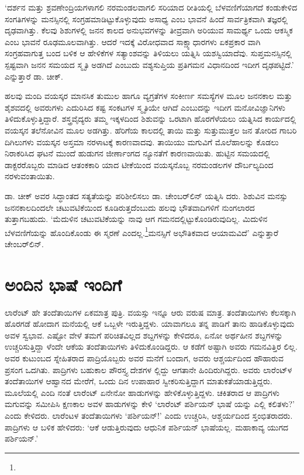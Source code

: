 ‘ದರ್ಶನ ಮತ್ತು ಶ್ರವಣೇಂದ್ರಿಯಗಳಾಗಲಿ ನರಮಂಡಲವಾಗಲಿ ಸರಿಯಾದ ರೀತಿಯಲ್ಲಿ ಬೆಳವಣಿಗೆಯಾಗದೆ ಕಂಡುಕೇಳಿದ ಸಂಗತಿಗಳನ್ನು ಮನಸ್ಸಿನಲ್ಲಿ ಸಂಗ್ರಹಮಾಡಿಟ್ಟುಕೊಳ್ಳುವುದು ಅಸಾಧ್ಯ ಎಂಬ ಭಾವನೆ ಹಿಂದೆ ಸಾರ್ವತ್ರಿಕವಾಗಿ ತಜ್ಞರಲ್ಲಿ ದೃಢವಾಗಿತ್ತು. ಕೆಲವು ಶಿಶುಗಳಲ್ಲಿ ಜನನ ಕಾಲದ ಅನುಭವಗಳನ್ನು ತೀವ್ರವಾಗಿ ಅರಿಯುವ ಸಾಮರ್ಥ್ಯ ಒಂದು ಆಕಸ್ಮಿಕ ಎಂಬ ಭಾವನೆ ರೂಢಮೂಲವಾಗಿತ್ತು. ಆದರೆ ಇದಕ್ಕೆ ವಿರೋಧವಾದ ಸಾಕ್ಷ್ಯಾಧಾರಗಳು ಏಕಪ್ರಕಾರ ವಾಗಿ ಸಂಗ್ರಹವಾಗುತ್ತ ಬಂದ ಬಳಿಕ ಆ ಹೇಳಿಕೆಗಳ ಸತ್ಯಾಂಶವನ್ನು ತಿಳಿಯಲು ಯತ್ನಿಸಿ ಯಶಸ್ವಿಯಾದೆವು. ಸುಪ್ತಮನಸ್ಸಿನಲ್ಲಿ ಸ್ಪಷ್ಟವಾಗಿ ಜನನ ಸಮಯದ ಸ್ಮೃತಿ ಅಡಗಿದೆ ಎಂಬುದು ವಶ್ಯಸುಪ್ತಿಯ ಪ್ರತಿಗಮನ ವಿಧಾನದಿಂದ ಇದೀಗ ದೃಢಪಟ್ಟಿದೆ.’ ಎನ್ನುತ್ತಾರೆ ಡಾ. ಚೀಕ್.

ಹಲವು ಮಂದಿ ವಯಸ್ಕರ ಮಾನಸಿಕ ತುಮುಲ ಹಾಗೂ ವ್ಯಗ್ರತೆಗಳ ಸಂಕೀರ್ಣ ಸಮಸ್ಯೆಗಳ ಮೂಲ ಜನನಕಾಲ ಮತ್ತು ಶೈಶವದಲ್ಲಿ ಅವರುಗಳು ಎದುರಿಸಿದ ಕಷ್ಟ ಸಂಕಟಗಳ ಸ್ಮೃತಿಯೇ ಆಗಿದೆ ಎಂಬುದನ್ನು ಇದೀಗ ಮನೋವಿಜ್ಞಾನಿಗಳು ತಿಳಿದುಕೊಳ್ಳುತ್ತಿದ್ದಾರೆ. ಶಸ್ತ್ರವೈದ್ಯರು ತಮ್ಮ ಇಕ್ಕಳದಿಂದ ಶಿಶುವನ್ನು ಒರಟಾಗಿ ಹೊರಗೆಳೆಯಲು ಯತ್ನಿಸಿದ ಕಾರ್ಯದಲ್ಲಿ ವಯಸ್ಕನ ತಲೆನೋವಿನ ಮೂಲ ಅಡಗಿತ್ತು. ಹೆರಿಗೆಯ ಕಾಲದಲ್ಲಿ ತಾಯಿ ಮತ್ತು ಸುತ್ತುಮುತ್ತಲ ಜನ ತೋರಿದ ಗಾಬರಿ ದಿಗಿಲುಗಳು ವಯಸ್ಕನ ಅಸ್ತಮಾ ನರಳಾಟಕ್ಕೆ ಕಾರಣವಾದವು. ತಾಯಿಯು ಮಗುವಿಗೆ ಮೊಲೆಹಾಲನ್ನು ಕೊಡಲು ನಿರಾಕರಿಸಿದ ಘಟನೆ ಮುಂದೆ ಹುಡುಗನ ಜೀರ್ಣಾಂಗದ ನ್ಯೂನತೆಗೆ ಕಾರಣವಾಯಿತು. ಹುಟ್ಟಿನ ಸಮಯದಲ್ಲಿ ಡಾಕ್ಟರರೊಬ್ಬರು ಮಾಡಿದ ಆತಂಕಕಾರಿ ಯಾದ ಟೀಕೆಯಿಂದ ವಯಸ್ಕನೊಬ್ಬ ನರಮಂಡಲಗಳ ದೌರ್ಬಲ್ಯದಿಂದ ನರಳುವಂತಾಯಿತು.

ಡಾ. ಚೀಕ್ ಅವರ ಸಿದ್ಧಾಂತದ ಸತ್ಯತೆಯನ್ನು ಪರಿಶೀಲಿಸಲು ಡಾ. ಚೇಂಬರ್​ಲಿನ್ ಯತ್ನಿಸಿ ದರು. ಶಿಶುವಿನ ಮನಸ್ಸು ಜನನಕಾಲದಿಂದಲೇ ಚಟುವಟಿಕೆಯಿಂದ ಕೂಡಿರುತ್ತದೆಂಬುದು ಹಲವು ಭೌತವಾದಿಗಳಿಗೆ ನುಂಗಲಾರದ ತುತ್ತಾಗಬಹುದು. ‘ಮೆದುಳಿನ ಚಟುವಟಿಕೆಯನ್ನು ನಾವು ಆಗ ಗಮನದಲ್ಲಿಟ್ಟುಕೊಂಡಿರುವುದಿಲ್ಲ. ಮಿದುಳಿನ ಬೆಳವಣಿಗೆಯನ್ನು ಹೊಂದಿಕೊಂಡು ಈ ಸ್ಮರಣೆ ಎಂದಲ್ಲ.\footnote{\hfill{}}ಮನಸ್ಸಿಗೆ ಅಭೌತಿಕವಾದ ಆಯಾಮವಿದೆ’ ಎನ್ನುತ್ತಾರೆ ಚೇಂಬರ್​ಲಿನ್.


\section{ಅಂದಿನ ಭಾಷೆ ಇಂದಿಗೆ}

ಲಾರೆಂಟ್ ಹೇ ತಂದೆತಾಯಿಗಳ ಏಕಮಾತ್ರ ಪುತ್ರಿ. ವಯಸ್ಸು ಇನ್ನೂ ಆರು ವರುಷ ಮಾತ್ರ. ತಂದೆತಾಯಿಗಳು ಕೆಲಸಕ್ಕಾಗಿ ಹೊರಗಡೆ ಹೋದಾಗ ಮನೆಯಲ್ಲಿ ಆಕೆ ಒಬ್ಬಳೇ ಇರುತ್ತಿದ್ದಳು. ಯಾವಾಗಲೂ ತನ್ನ ಪಾಡಿಗೆ ತಾನು ಹಾಡಿಕೊಳ್ಳುವುದು ಅವಳ ಸ್ವಭಾವ. ಎಷ್ಟೋ ವೇಳೆ ತಮಗೆ ಪರಿಚಿತವಿಲ್ಲದ ಶಬ್ದಗಳನ್ನು ಕೇಳಿದರೂ, ಏನೋ ಅರ್ಥಹೀನ ಶಬ್ದಗಳನ್ನು ಉಚ್ಚರಿಸುತ್ತಿದ್ದಾ ಳೆಂದೇ ಆಕೆಯ ತಂದೆತಾಯಿಗಳು ತಿಳಿದುಕೊಂಡಿದ್ದರು. ಆ ಕಡೆಗೆ ಅಷ್ಟಾಗಿ ಅವರು ಗಮನವಿತ್ತಿರ ಲಿಲ್ಲ. ಅವರ ಕುಟುಂಬದ ಸ್ನೇಹಿತರಾದ ಪಾದ್ರಿಯೊಬ್ಬರು ಅವರ ಮನೆಗೆ ಬಂದಾಗ, ಅವರು ಆಶ್ಚರ್ಯದಿಂದ ಹೌಹಾರುವ ಪ್ರಸಂಗ ಒದಗಿತು. ಪಾದ್ರಿಗಳು ಬಹುಕಾಲ ಪೌರಸ್ತ್ಯ ದೇಶಗಳ ಲ್ಲಿದ್ದು ಆಗತಾನೇ ಹಿಂದಿರುಗಿದ್ದರು. ಅವರು ಲಾರೆಂಟ್​ಳ ತಂದೆತಾಯಿಗಳ ಆಹ್ವಾನದ ಮೇರೆಗೆ, ಒಂದು ದಿನ ಉಪಾಹಾರ ಸ್ವೀಕರಿಸುತ್ತಿದ್ದಾಗ ಮಾತುಕತೆಯಾಡುತ್ತಿದ್ದರು. ಮೂಲೆಯಲ್ಲಿ ಎಂದಿ ನಂತೆ ಲಾರೆಂಟ್ ಏನೇನೋ ಹಾಡುಗಳನ್ನು ಹೇಳಿಕೊಳ್ಳುತ್ತಿದ್ದಳು. ಚಕಿತರಾದ ಆ ಪಾದ್ರಿಗಳು ಮಗುವನ್ನು ಸಮೀಪಿಸಿ ಕ್ಷಣಕಾಲ ಅವಳ ಹಾಡುಗಳನ್ನು ಕೇಳಿ ‘ಲಾರೆಂಟ್ ಪರ್ಶಿಯನ್ ಭಾಷೆ ಯನ್ನು ಎಲ್ಲಿ ಕಲಿತಳು?’ ಎಂದು ಕೇಳಿದರು. ಲಾರೆಂಟಳ ತಂದೆತಾಯಿಗಳು ‘ಪರ್ಶಿಯನ್​!’ ಎಂದು ಉಚ್ಚರಿಸಿ, ಆಶ್ಚರ್ಯದಿಂದ ಸ್ತಂಭಿತರಾದರು. ಪಾದ್ರಿಗಳು ಆ ಬಳಿಕ ಹೇಳಿದರು: ‘ಆಕೆ ಆಡುತ್ತಿರುವುದು ಆಧುನಿಕ ಪರ್ಶಿಯನ್ ಭಾಷೆಯಲ್ಲ. ಮಹಾಕಾವ್ಯ ಯುಗದ ಪರ್ಶಿಯನ್.’

